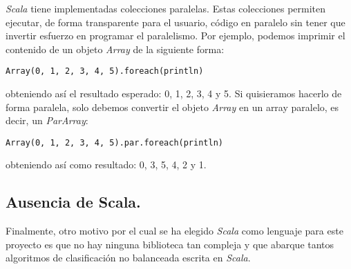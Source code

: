 \textit{Scala} tiene implementadas colecciones paralelas. Estas colecciones permiten ejecutar, de forma transparente para el usuario, código en paralelo sin tener que invertir esfuerzo en programar el paralelismo. Por ejemplo, podemos imprimir el contenido de un objeto \textit{Array} de la siguiente forma:

\begin{lstlisting}[frame=single, basicstyle=\scriptsize, breaklines=true]
Array(0, 1, 2, 3, 4, 5).foreach(println)
\end{lstlisting}

obteniendo así el resultado esperado: 0, 1, 2, 3, 4 y 5. Si quisieramos hacerlo de forma paralela, solo debemos convertir el objeto \textit{Array} en un array paralelo, es decir, un \textit{ParArray}:

\begin{lstlisting}[frame=single, basicstyle=\scriptsize, breaklines=true]
Array(0, 1, 2, 3, 4, 5).par.foreach(println)
\end{lstlisting}

obteniendo así como resultado: 0, 3, 5, 4, 2 y 1.

\subsection{Ausencia de Scala.} \label{subsec:ausencia}

Finalmente, otro motivo por el cual se ha elegido \textit{Scala} como lenguaje para este proyecto es que no hay ninguna biblioteca tan compleja y que abarque tantos algoritmos de clasificación no balanceada escrita en \textit{Scala}.